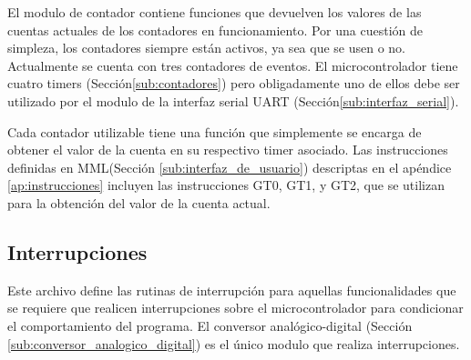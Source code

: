 El modulo de contador contiene funciones que devuelven los valores de las cuentas actuales de los contadores en funcionamiento. Por una cuestión de simpleza, los contadores siempre están activos, ya sea que se usen o no. Actualmente se cuenta con tres contadores de eventos. El microcontrolador tiene cuatro timers (Sección\ref{sub:contadores}) pero obligadamente uno de ellos debe ser utilizado por el modulo de la interfaz serial UART (Secci\'on\ref{sub:interfaz_serial}).

Cada contador utilizable tiene una función que simplemente se encarga de obtener el valor de la cuenta en su respectivo timer asociado. Las instrucciones definidas en MML(Sección \ref{sub:interfaz_de_usuario}) descriptas en el apéndice \ref{ap:instrucciones} incluyen las instrucciones GT0, GT1, y GT2, que se utilizan para la obtención del valor de la cuenta actual.

\subsection{Interrupciones} %
\label{sub:interrupciones}

Este archivo define las rutinas de interrupción para aquellas funcionalidades que se requiere que realicen interrupciones sobre el microcontrolador para condicionar el comportamiento del programa. El conversor analógico-digital (Sección \ref{sub:conversor_analogico_digital}) es el único modulo que realiza interrupciones.


\clearpage

